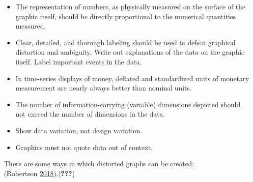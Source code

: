 \documentclass[]{book}
\providecommand{\tightlist}{%
  \setlength{\itemsep}{0pt}\setlength{\parskip}{0pt}}
\theoremstyle{definition}
\theoremstyle{definition}
\theoremstyle{definition}
\theoremstyle{remark}
\begin{document}
\begin{itemize}
\tightlist
\item
  The representation of numbers, as physically measured on the surface
  of the graphic itself, should be directly proportional to the
  numerical quantities measured.
\item
  Clear, detailed, and thorough labeling should be used to defeat
  graphical distortion and ambiguity. Write out explanations of the data
  on the graphic itself. Label important events in the data.
\item
  In time-series displays of money, deﬂated and standardized units of
  monetary measurement are nearly always better than nominal units.
\item
  The number of information-carrying (variable) dimensions depicted
  should not exceed the number of dimensions in the data.
\item
  Show data variation, not design variation.
\item
  Graphics must not quote data out of context.
\end{itemize}

There are some ways in which distorted graphs can be created:\\
(Robertson \protect\hyperlink{ref-evil_axes}{2018}),({\textbf{???}})
\end{document}
